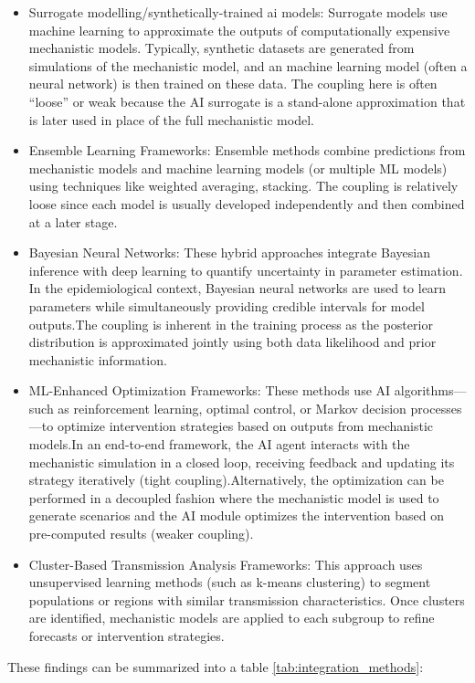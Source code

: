 \begin{itemize}
    \item Surrogate modelling/synthetically-trained ai models: Surrogate models use machine learning to approximate the outputs of computationally expensive mechanistic models. Typically, synthetic datasets are generated from simulations of the mechanistic model, and an machine learning model (often a neural network) is then trained on these data. The coupling here is often “loose” or weak because the AI surrogate is a stand-alone approximation that is later used in place of the full mechanistic model.
    \item Ensemble Learning Frameworks: Ensemble methods combine predictions from mechanistic models and machine learning models (or multiple ML models) using techniques like weighted averaging, stacking. The coupling is relatively loose since each model is usually developed independently and then combined at a later stage.
    \item Bayesian Neural Networks: These hybrid approaches integrate Bayesian inference with deep learning to quantify uncertainty in parameter estimation. In the epidemiological context, Bayesian neural networks are used to learn parameters while simultaneously providing credible intervals for model outputs.The coupling is inherent in the training process as the posterior distribution is approximated jointly using both data likelihood and prior mechanistic information.
    \item ML-Enhanced Optimization Frameworks: These methods use AI algorithms—such as reinforcement learning, optimal control, or Markov decision processes—to optimize intervention strategies based on outputs from mechanistic models.In an end-to-end framework, the AI agent interacts with the mechanistic simulation in a closed loop, receiving feedback and updating its strategy iteratively (tight coupling).Alternatively, the optimization can be performed in a decoupled fashion where the mechanistic model is used to generate scenarios and the AI module optimizes the intervention based on pre-computed results (weaker coupling).
    \item Cluster-Based Transmission Analysis Frameworks: This approach uses unsupervised learning methods (such as k-means clustering) to segment populations or regions with similar transmission characteristics. Once clusters are identified, mechanistic models are applied to each subgroup to refine forecasts or intervention strategies.
\end{itemize}

These findings can be summarized into a table \ref{tab:integration_methods}:

